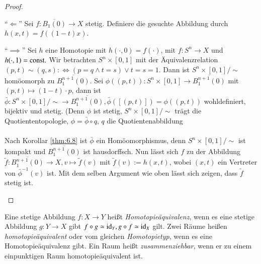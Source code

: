\documentclass[a4paper,10pt]{scrartcl}
\begin{document}
\begin{proof}
 \begin{seg}{"`$\Longleftarrow$"'}
  Sei $f: \overline{B_1(0)}\to X$ stetig. Definiere die gesuchte Abbildung durch $h(x,t)=f((1-t)x)$.
 \end{seg}
\begin{seg}{"`$\implies$"'}
 Sei $h$ eine Homotopie mit $h(\cdot, 0)=f(\cdot)$, mit $f:S^n \to X$ und $h(\cdot, 1)=\text{const}.$
\fixme[fig42]
Wir betrachten $S^n\times[0,1]$ mit der Äquivalenzrelation $(p,t)\sim (q,s) :\iff (p=q \land t=s) \lor t=s=1$. Dann ist $S^n\times[0,1]/\sim$ homöomorph zu $\overline{B_1^{n+1}(0)}$. Sei $\phi ((p,t)):S^n\times[0,1]\to \overline{B_1^{n+1}(0)}$ mit $(p,t)\mapsto (1-t)\cdot p$, dann ist $\bar \phi: S^n \times[0,1]/\sim \to \overline{B_1^{n+1}(0)}, \bar \phi([(p,t)])=\phi((p,t))$ wohldefiniert, bijektiv und stetig. (Denn $\phi$ ist stetig, $S^n\times [0,1]/\sim$ trägt die Quotiententopologie, $\phi=\bar \phi \circ q $, $q$ die Quotientenabbildung\\
\\
Nach Korollar \ref{thm:6.8} ist $\bar \phi$ ein Homöomorphismus, denn $S^n\times [0,1]/\sim$ ist kompakt und $\overline{B_1^{n+1}(0)}$ ist hausdorffsch. Nun lässt sich $f$ zu der Abbildung $\tilde f: \overline{B_1^{n+1}(0)}\to X, v\mapsto \tilde f(v)$ mit $\tilde f(v):= h(x,t)$,
wobei $(x,t)$ ein Vertreter von $\bar \phi^{-1}(v)$ ist. Mit dem selben Argument wie oben lässt sich zeigen, dass $\tilde f$ stetig ist.
\end{seg}
\end{proof}
\begin{df}
 Eine stetige Abbildung $f: X\to Y$ heißt \emph{Homotopieäquivalenz}, wenn es eine stetige Abbildung $g: Y\to X$ gibt $f\circ g \simeq \operatorname{id}_Y, g\circ f \simeq \operatorname{id}_X$ gilt. Zwei
Räume heißen \emph{homotopieäquivalent} oder vom gleichen \emph{Homotopietyp}, wenn es eine Homotopieäquivalenz gibt. Ein Raum heißt \emph{zusammenziehbar}, wenn er zu einem einpunktigen Raum homotopieäquivalent ist.
\end{df}
\end{document}
